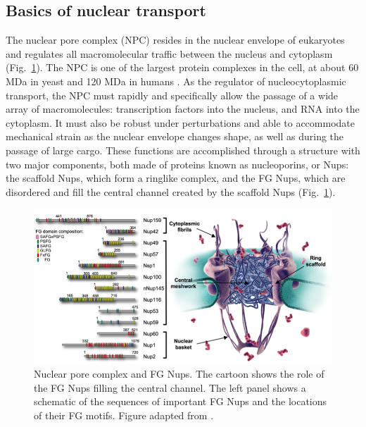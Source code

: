 \subsection{Basics of nuclear transport}
\label{sec:npc-basics}

The nuclear pore complex (NPC) resides in the nuclear envelope of eukaryotes and regulates all macromolecular traffic between the nucleus and cytoplasm (Fig.~\ref{fig:NPC}).  The NPC is one of the largest protein complexes in the cell, at about 60 MDa in yeast and 120 MDa in humans \cite{beck17}.  As the regulator of nucleocytoplasmic transport, the NPC must rapidly and specifically allow  the passage of a wide array of macromolecules: transcription factors into the nucleus, and RNA into the cytoplasm.  It must also be robust under perturbations and able to accommodate mechanical strain as the nuclear envelope changes shape, as well as during the passage of large cargo.  These functions are accomplished through a structure with two major components, both made of proteins known as nucleoporins, or Nups: the scaffold Nups, which form a ringlike complex, and the FG Nups, which are disordered and fill the central channel created by the scaffold Nups (Fig.~\ref{fig:NPC}).  

\begin{figure}[t!]
\centering
\includegraphics[width=\textwidth]{figs/ch01/patel.pdf}
\caption[Nuclear pore complex and FG Nups.]{Nuclear pore complex and FG Nups.  The cartoon shows the role of the FG Nups filling the central channel.  The left panel shows a schematic of the sequences of important FG Nups and the locations of their FG motifs. Figure adapted from \cite{patel07}.}
\label{fig:NPC}
\end{figure}


